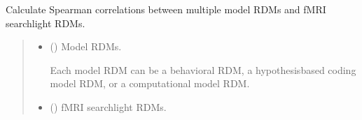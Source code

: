 \documentclass[letterpaper,10pt,english]{sphinxhowto}
\begin{document}
\begin{fulllineitems}
\label{\detokenize{corr_cal_by_rdm:neurora.corr_cal_by_rdm.fmrirdms_corr}}
\pysigstartsignatures
{}
\pysigstopsignatures
\sphinxAtStartPar
Calculate Spearman correlations between multiple model RDMs and fMRI searchlight RDMs.
\begin{quote}\begin{description}
\begin{itemize}
\item {} 
\sphinxAtStartPar
{} (\sphinxstyleliteralemphasis{\sphinxupquote{, }}\sphinxstyleliteralemphasis{\sphinxupquote{ {[}}}\sphinxstyleliteralemphasis{\sphinxupquote{, }}\sphinxstyleliteralemphasis{\sphinxupquote{, }}\sphinxstyleliteralemphasis{\sphinxupquote{{]}}}) \textendash{} 
\sphinxAtStartPar
Model RDMs.

\sphinxAtStartPar
Each model RDM can be a behavioral RDM, a hypothesis\sphinxhyphen{}based coding
model RDM, or a computational model RDM.


\item {} 
\sphinxAtStartPar
{} (\sphinxstyleliteralemphasis{\sphinxupquote{, }}\sphinxstyleliteralemphasis{\sphinxupquote{ {[}}}\sphinxstyleliteralemphasis{\sphinxupquote{, }}\sphinxstyleliteralemphasis{\sphinxupquote{, }}\sphinxstyleliteralemphasis{\sphinxupquote{, }}\sphinxstyleliteralemphasis{\sphinxupquote{, }}\sphinxstyleliteralemphasis{\sphinxupquote{{]}}}) \textendash{} 
\sphinxAtStartPar
fMRI searchlight RDMs.


\end{itemize}
\end{description}
\end{quote}
\end{fulllineitems}
\end{document}

